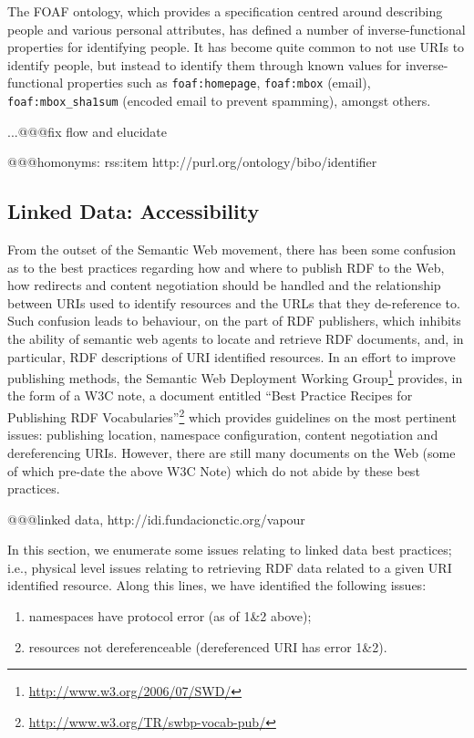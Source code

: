 \documentclass{llncs}
\begin{document}
The FOAF ontology, which provides a specification centred around describing people and various personal attributes, has defined a number of inverse-functional properties for identifying people.
It has become quite common to not use URIs to identify people, but instead to identify them through known values for inverse-functional properties such as {\tt foaf:homepage}, {\tt foaf:mbox} (email), {\tt foaf:mbox\_sha1sum} (encoded email to prevent spamming), amongst others.

...@@@fix flow and elucidate

@@@homonyms: rss:item http://purl.org/ontology/bibo/identifier

\subsection{Linked Data: Accessibility}
From the outset of the Semantic Web movement, there has been some confusion as to the best practices regarding how and where to publish RDF to the Web, how redirects and content negotiation should be handled and the relationship between URIs used to identify resources and the URLs that they de-reference to.
Such confusion leads to behaviour, on the part of RDF publishers, which inhibits the ability of semantic web agents to locate and retrieve RDF documents, and, in particular, RDF descriptions of URI identified resources.
In an effort to improve publishing methods, the Semantic Web Deployment Working Group\footnote{\url{http://www.w3.org/2006/07/SWD/}} provides, in the form of a W3C note, a document entitled ``Best Practice Recipes for Publishing RDF Vocabularies''\footnote{\url{http://www.w3.org/TR/swbp-vocab-pub/}} which provides guidelines on the most pertinent issues: publishing location, namespace configuration, content negotiation and dereferencing URIs.
However, there are still many documents on the Web (some of which pre-date the above W3C Note) which do not abide by these best practices.

@@@linked data, http://idi.fundacionctic.org/vapour

In this section, we enumerate some issues relating to linked data best practices; i.e., physical level issues relating to retrieving RDF data related to a given URI identified resource. Along this lines, we have identified the following issues:

\begin{enumerate}
\item namespaces have protocol error (as of 1\&2 above);
\item resources not dereferenceable (dereferenced URI has error 1\&2).
\end{enumerate}
\end{document}
